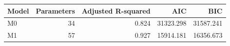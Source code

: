 \begin{tabular}{lrrrr}
\toprule
Model & Parameters & Adjusted R-squared & AIC & BIC \\
\midrule
M0 & 34 & 0.824 & 31323.298 & 31587.241 \\
M1 & 57 & 0.927 & 15914.181 & 16356.673 \\
\bottomrule
\end{tabular}

